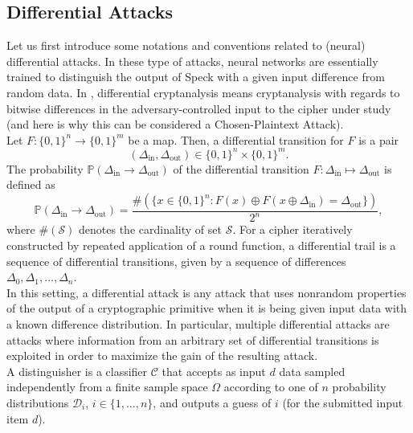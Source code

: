 \documentclass[%
    corpo=11pt,
    twoside,
    stile=classica,
    oldstyle,
    autoretitolo,
    tipotesi=magistrale,
    greek,
    evenboxes,
    english
]{toptesi}
\begin{document}
\subsection{Differential Attacks}
Let us first introduce some notations and conventions related to (neural) differential attacks. In these type of attacks, neural networks are essentially trained to distinguish the output of Speck with a given input difference from random data. In \cite{gohr}, differential cryptanalysis means cryptanalysis with regards to bitwise differences in the adversary-controlled input to the cipher under study (and here is why this can be considered a Chosen-Plaintext Attack). \\
Let $F: \{0,1\}^n \longrightarrow \{0,1\}^m$ be a map. Then, a differential transition for $F$ is a pair
\begin{equation}
\left(\Delta_{\text{in}},\Delta_{\text{out}} \right) \in \{0,1\}^n \times \{0,1\}^m.
\end{equation}
The probability $\mathbb{P}\left( \Delta_{\text{in}} \rightarrow \Delta_{\text{out}}\right)$ of the differential transition $F:\Delta_{\text{in}} \mapsto \Delta_{\text{out}} $ is defined as
\begin{equation}
\mathbb{P}\left( \Delta_{\text{in}} \rightarrow \Delta_{\text{out}}\right) =
\frac{\#\left(\{x \in \{0,1\}^n: F(x) \oplus F(x \oplus \Delta_{\text{in}} ) = \Delta_{\text{out}} \} \right)}{2^n},
\end{equation}
where $\#(\mathcal{S})$ denotes the cardinality of set $\mathcal{S}$. For a cipher iteratively constructed by repeated application of a round function, a differential trail is a sequence of differential transitions, given by a sequence of differences $\Delta_0, \Delta_1, \dots, \Delta_n$. \\
In this setting, a differential attack is any attack that uses nonrandom properties of the output of a cryptographic primitive when it is being given input data with a known difference distribution. In particular, multiple differential attacks are attacks where information from an arbitrary set of differential transitions is exploited in order to maximize the gain of the resulting attack. \\
A distinguisher is a classifier $\mathcal{C}$ that accepts as input $d$ data sampled independently from a finite sample space $\Omega$ according to one of $n$ probability distributions $\mathcal{D}_i$, $i \in \{1,\dots,n\}$, and outputs a guess of $i$ (for the submitted input item $d$). \\
\end{document}
